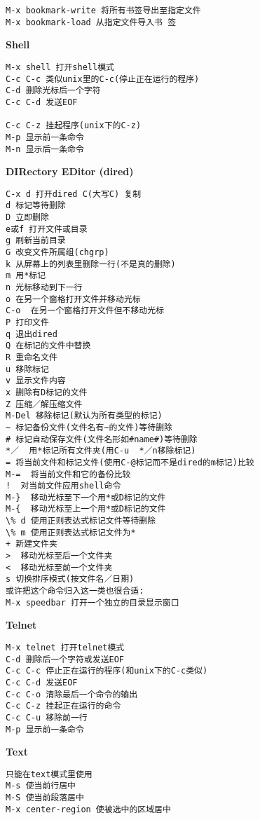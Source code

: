 \documentclass{article}
\newcommand{\xiaosi}{\fontsize{12pt}{18pt}\selectfont}            %
\begin{document}
\begin{multicols}{2}
\begin{verbatim}
M-x bookmark-write 将所有书签导出至指定文件 
M-x bookmark-load 从指定文件导入书 签
\end{verbatim}
\vspace{-9pt}
\noindent \textbf{\xiaosi Shell}
\vspace{-9pt}
\begin{verbatim}
M-x shell 打开shell模式
C-c C-c 类似unix里的C-c(停止正在运行的程序)
C-d 删除光标后一个字符
C-c C-d 发送EOF

C-c C-z 挂起程序(unix下的C-z)
M-p 显示前一条命令
M-n 显示后一条命令
\end{verbatim}
\vspace{-9pt}
\noindent \textbf{\xiaosi DIRectory EDitor (dired)}
\vspace{-9pt}
\begin{verbatim}
C-x d 打开dired C(大写C) 复制
d 标记等待删除
D 立即删除
e或f 打开文件或目录
g 刷新当前目录
G 改变文件所属组(chgrp)
k 从屏幕上的列表里删除一行(不是真的删除)
m 用*标记
n 光标移动到下一行
o 在另一个窗格打开文件并移动光标
C-o  在另一个窗格打开文件但不移动光标
P 打印文件
q 退出dired
Q 在标记的文件中替换
R 重命名文件
u 移除标记
v 显示文件内容
x 删除有D标记的文件
Z 压缩／解压缩文件
M-Del 移除标记(默认为所有类型的标记)
~ 标记备份文件(文件名有~的文件)等待删除
# 标记自动保存文件(文件名形如#name#)等待删除
*／  用*标记所有文件夹(用C-u  *／n移除标记)
= 将当前文件和标记文件(使用C-@标记而不是dired的m标记)比较
M-=  将当前文件和它的备份比较
!  对当前文件应用shell命令
M-}  移动光标至下一个用*或D标记的文件
M-{  移动光标至上一个用*或D标记的文件
\% d 使用正则表达式标记文件等待删除
\% m 使用正则表达式标记文件为*
+ 新建文件夹
>  移动光标至后一个文件夹
<  移动光标至前一个文件夹
s 切换排序模式(按文件名／日期)
或许把这个命令归入这一类也很合适: 
M-x speedbar 打开一个独立的目录显示窗口
\end{verbatim}
\vspace{-9pt}
\noindent \textbf{\xiaosi Telnet}
\vspace{-9pt}
\begin{verbatim}
M-x telnet 打开telnet模式
C-d 删除后一个字符或发送EOF
C-c C-c 停止正在运行的程序(和unix下的C-c类似)
C-c C-d 发送EOF
C-c C-o 清除最后一个命令的输出
C-c C-z 挂起正在运行的命令
C-c C-u 移除前一行
M-p 显示前一条命令
\end{verbatim}
\vspace{-9pt}
\noindent \textbf{\xiaosi Text}
\vspace{-9pt}
\begin{verbatim}
只能在text模式里使用
M-s 使当前行居中
M-S 使当前段落居中
M-x center-region 使被选中的区域居中

\end{verbatim}
\end{multicols}
\end{document}

